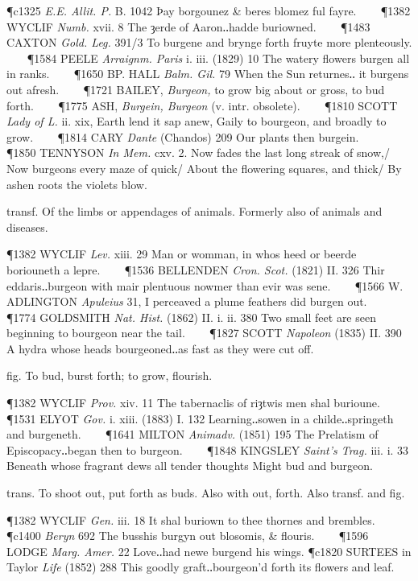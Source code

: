 \begin{description}[wide, labelwidth=!, labelindent=0pt]
\begin{myenumerate}
\P c1325 \textit{E.E. Allit. P.} B. 1042 Þay borgounez \& beres blomez ful fayre.    
\P 1382 WYCLIF  \textit{Numb.} xvii. 8 The ȝerde of Aaron‥hadde buriowned.    
\P 1483 CAXTON  \textit{Gold. Leg.} 391/3 To burgene and brynge forth fruyte more plenteously.    
\P 1584 PEELE  \textit{Arraignm. Paris} i. iii. (1829) 10 The watery flowers burgen all in ranks.    
\P 1650 BP. HALL  \textit{Balm. Gil.} 79 When the Sun returnes‥ it burgens out afresh.    
\P 1721 BAILEY,  \textit{Burgeon,} to grow big about or gross, to bud forth.    
\P 1775 ASH,  \textit{Burgein, Burgeon} (v. intr. obsolete).    
\P 1810 SCOTT  \textit{Lady of L.} ii. xix, Earth lend it sap anew, Gaily to bourgeon, and broadly to grow.    
\P 1814 CARY  \textit{Dante} (Chandos) 209 Our plants then burgein.    
\P 1850 TENNYSON  \textit{In Mem.} cxv. 2. Now fades the last long streak of snow,/ Now burgeons every maze of quick/ About the flowering squares, and thick/ By ashen roots the violets blow.  

 transf. Of the limbs or appendages of animals. Formerly also of animals and diseases.

\P 1382 WYCLIF  \textit{Lev.} xiii. 29 Man or womman, in whos heed or beerde boriouneth a lepre.    
\P 1536 BELLENDEN  \textit{Cron. Scot.} (1821) II. 326 Thir eddaris‥burgeon with mair plentuous nowmer than evir was sene.    
\P 1566 W. ADLINGTON  \textit{Apuleius} 31, I perceaved a plume feathers did burgen out.    
\P 1774 GOLDSMITH  \textit{Nat. Hist.} (1862) II. i. ii. 380 Two small feet are seen beginning to bourgeon near the tail.    
\P 1827 SCOTT  \textit{Napoleon} (1835) II. 390 A hydra whose heads bourgeoned‥as fast as they were cut off.

 fig. To bud, burst forth; to grow, flourish.

\P 1382 WYCLIF  \textit{Prov.} xiv. 11 The tabernaclis of riȝtwis men shal burioune.    
\P 1531 ELYOT  \textit{Gov.} i. xiii. (1883) I. 132 Learning‥sowen in a childe‥springeth and burgeneth.    
\P 1641 MILTON  \textit{Animadv.} (1851) 195 The Prelatism of Episcopacy‥began then to burgeon.    
\P 1848 KINGSLEY  \textit{Saint's Trag.} iii. i. 33 Beneath whose fragrant dews all tender thoughts Might bud and burgeon.

 trans. To shoot out, put forth as buds. Also with out, forth. Also transf. and fig.

\P 1382 WYCLIF  \textit{Gen.} iii. 18 It shal buriown to thee thornes and brembles.
\P c1400 \textit{Beryn}  692 The busshis burgyn out blosomis, \& flouris.    
\P 1596 LODGE  \textit{Marg. Amer.} 22 Love‥had newe burgend his wings.
\P c1820 SURTEES in Taylor \textit{Life} (1852) 288 This goodly graft‥bourgeon'd forth its flowers and leaf.
\end{myenumerate}

\end{description}



